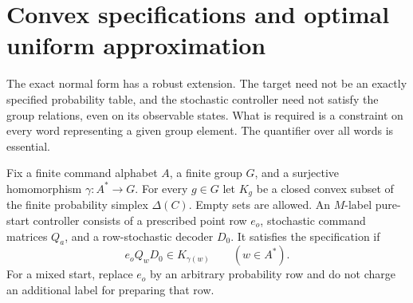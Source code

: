 \section{Convex specifications and optimal uniform approximation}
\label{sec:r76-convex-specifications}

The exact normal form has a robust extension. The target need not be an
exactly specified probability table, and the stochastic controller need
not satisfy the group relations, even on its observable states. What is
required is a constraint on every word representing a given group element.
The quantifier over all words is essential.

Fix a finite command alphabet $A$, a finite group $G$, and a surjective
homomorphism $\gamma:A^*\to G$. For every $g\in G$ let $K_g$ be a closed
convex subset of the finite probability simplex $\Delta(C)$. Empty sets
are allowed. An $M$-label pure-start controller consists of a prescribed
point row $e_o$, stochastic command matrices $Q_a$, and a row-stochastic
decoder $D_0$. It satisfies the specification if
\begin{equation}\label{eq:r76-specification}
 e_oQ_wD_0\in K_{\gamma(w)}\qquad(w\in A^*).
\end{equation}
For a mixed start, replace $e_o$ by an arbitrary probability row and do
not charge an additional label for preparing that row.

